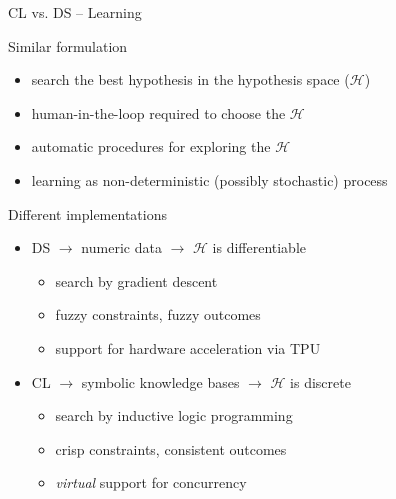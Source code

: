 \documentclass[presentation]{beamer}\mode<presentation>{\usetheme{AMSBolognaFC}}
\begin{document}
\begin{frame}[allowframebreaks]{CL vs. DS -- Learning}
    \begin{block}{Similar formulation}
        \begin{itemize}
            \item \alert{search} the best hypothesis in the \alert{hypothesis space} ($\mathcal{H}$)
            \item \alert{human-in-the-loop} required to choose the $\mathcal{H}$
            \item automatic procedures for \alert{exploring} the $\mathcal{H}$
            \item learning as \alert{non-deterministic} (possibly stochastic) process
        \end{itemize}
    \end{block}

    \begin{block}{Different implementations}
        \begin{itemize}
            \item DS $\rightarrow$ numeric data $\rightarrow$ $\mathcal{H}$ is \alert{differentiable}
            \begin{itemize}
                \item search by \alert{gradient descent}
                \item \alert{fuzzy} constraints, fuzzy outcomes
                \item support for \alert{hardware acceleration} via TPU
            \end{itemize}

            \bigskip

            \item CL $\rightarrow$ symbolic knowledge bases $\rightarrow$ $\mathcal{H}$ is \alert{discrete}
            \begin{itemize}
                \item search by \alert{inductive logic programming}
                \item \alert{crisp} constraints, consistent outcomes
                \item \emph{virtual} support for \alert{concurrency} 
            \end{itemize}
        \end{itemize}
    \end{block}


\end{frame}
\end{document}
